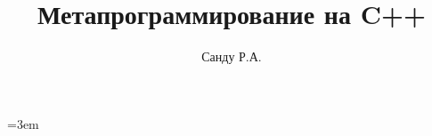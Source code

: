 \documentclass[a5paper, 11pt, openany]{book}
\title{Метапрограммирование на C++}
\author{Санду Р.А.}
\begin{document}
\maketitle
\tableofcontents




\emergencystretch=3em
\printbibliography
\end{document}

